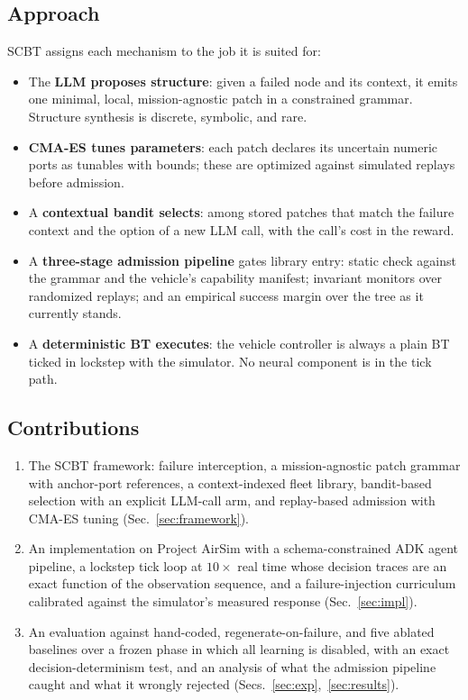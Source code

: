 \documentclass[conference]{IEEEtran}
\begin{document}
\subsection{Approach}

SCBT assigns each mechanism to the job it is suited for:
\begin{itemize}
\item The \textbf{LLM proposes structure}: given a failed node and its context, it emits one minimal, local, mission-agnostic patch in a constrained grammar. Structure synthesis is discrete, symbolic, and rare.
\item \textbf{CMA-ES tunes parameters}: each patch declares its uncertain numeric ports as tunables with bounds; these are optimized against simulated replays before admission.
\item A \textbf{contextual bandit selects}: among stored patches that match the failure context and the option of a new LLM call, with the call's cost in the reward.
\item A \textbf{three-stage admission pipeline} gates library entry: static check against the grammar and the vehicle's capability manifest; invariant monitors over randomized replays; and an empirical success margin over the tree as it currently stands.
\item A \textbf{deterministic BT executes}: the vehicle controller is always a plain BT ticked in lockstep with the simulator. No neural component is in the tick path.
\end{itemize}

\subsection{Contributions}
\begin{enumerate}
\item The SCBT framework: failure interception, a mission-agnostic patch grammar with anchor-port references, a context-indexed fleet library, bandit-based selection with an explicit LLM-call arm, and replay-based admission with CMA-ES tuning (Sec.~\ref{sec:framework}).
\item An implementation on Project AirSim with a schema-constrained ADK agent pipeline, a lockstep tick loop at $10\times$ real time whose decision traces are an exact function of the observation sequence, and a failure-injection curriculum calibrated against the simulator's measured response (Sec.~\ref{sec:impl}).
\item An evaluation against hand-coded, regenerate-on-failure, and five ablated baselines over a frozen phase in which all learning is disabled, with an exact decision-determinism test, and an analysis of what the admission pipeline caught and what it wrongly rejected (Secs.~\ref{sec:exp},~\ref{sec:results}).
\end{enumerate}
\end{document}
